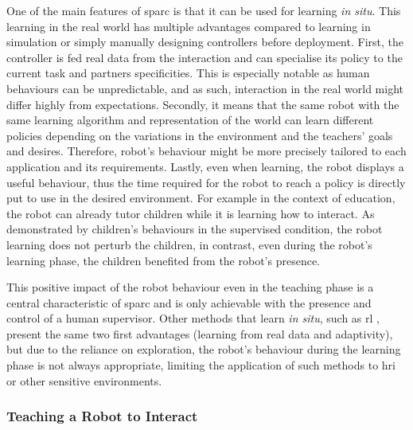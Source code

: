 One of the main features of \gls{sparc} is that it can be used for learning \emph{in situ}. This learning in the real world has multiple advantages compared to learning in simulation or simply manually designing controllers before deployment. First, the controller is fed real data from the interaction and can specialise its policy to the current task and partners specificities. This is especially notable as human behaviours can be unpredictable, and as such, interaction in the real world might differ highly from expectations. Secondly, it means that the same robot with the same learning algorithm and representation of the world can learn different policies depending on the variations in the environment and the teachers' goals and desires. Therefore, robot's behaviour might be more precisely tailored to each application and its requirements. Lastly, even when learning, the robot displays a useful behaviour, thus the time required for the robot to reach a policy is directly put to use in the desired environment. For example in the context of education, the robot can already tutor children while it is learning how to interact. As demonstrated by children's behaviours in the supervised condition, the robot learning does not perturb the children, in contrast, even during the robot's learning phase, the children benefited from the robot's presence. 

This positive impact of the robot behaviour even in the teaching phase is a central characteristic of \gls{sparc} and is only achievable with the presence and control of a human supervisor. Other methods that learn \emph{in situ}, such as \gls{rl} \citep{sutton1998reinforcement}, present the same two first advantages (learning from real data and adaptivity), but due to the reliance on exploration, the robot's behaviour during the learning phase is not always appropriate, limiting the application of such methods to \gls{hri} or other sensitive environments.

\subsubsection{Teaching a Robot to Interact}

